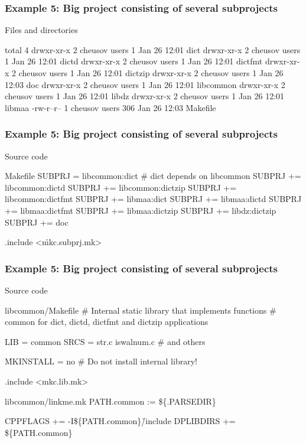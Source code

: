 \documentclass[hyperref={colorlinks=true}]{beamer}
\begin{document}
\begin{frame}[fragile]
  \frametitle{Example 5: Big project consisting of several subprojects}

  \begin{block}{Files and directories}
    \begin{CodeNoLabel}
total 4
drwxr-xr-x 2 cheusov users   1 Jan 26 12:01 dict
drwxr-xr-x 2 cheusov users   1 Jan 26 12:01 dictd
drwxr-xr-x 2 cheusov users   1 Jan 26 12:01 dictfmt
drwxr-xr-x 2 cheusov users   1 Jan 26 12:01 dictzip
drwxr-xr-x 2 cheusov users   1 Jan 26 12:03 doc
drwxr-xr-x 2 cheusov users   1 Jan 26 12:01 libcommon
drwxr-xr-x 2 cheusov users   1 Jan 26 12:01 libdz
drwxr-xr-x 2 cheusov users   1 Jan 26 12:01 libmaa
-rw-r--r-- 1 cheusov users 306 Jan 26 12:03 \h{Makefile}
\prompt{\$}
    \end{CodeNoLabel}
  \end{block}
\end{frame}

\begin{frame}[fragile]
  \frametitle{Example 5: Big project consisting of several subprojects}

  \begin{block}{Source code}
  \begin{Code}{Makefile}
SUBPRJ =   libcommon:dict   # dict depends on libcommon
SUBPRJ +=  libcommon:dictd
SUBPRJ +=  libcommon:dictzip
SUBPRJ +=  libcommon:dictfmt
SUBPRJ +=  libmaa:dict
SUBPRJ +=  libmaa:dictd
SUBPRJ +=  libmaa:dictfmt
SUBPRJ +=  libmaa:dictzip
SUBPRJ +=  libdz:dictzip
SUBPRJ +=  doc

.include <\h{mkc.subprj.mk}>
  \end{Code}
  \end{block}
\end{frame}

\begin{frame}[fragile]
  \frametitle{Example 5: Big project consisting of several subprojects}

  \begin{block}{Source code}
  \begin{Code}{libcommon/Makefile}
# Internal static library that implements functions
# common for dict, dictd, dictfmt and dictzip applications

LIB =            common
SRCS =           str.c iswalnum.c # and others

\h{MKINSTALL} =   no # Do not install internal library!

.include <mkc.lib.mk>
  \end{Code}
  \begin{Code}{libcommon/linkme.mk}
PATH.common :=      \$\{.PARSEDIR\}

CPPFLAGS +=      -I\$\{PATH.common\}\h{/include}
DPLIBDIRS +=     \$\{PATH.common\}
  \end{Code}
  \end{block}
\end{frame}
\end{document}
